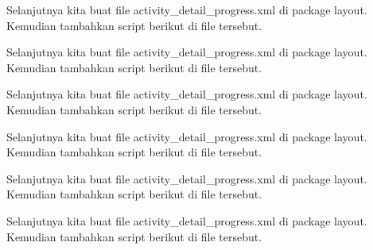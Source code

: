 

Selanjutnya kita buat file activity\_detail\_progress.xml di package layout. Kemudian tambahkan script berikut di file tersebut.





Selanjutnya kita buat file activity\_detail\_progress.xml di package layout. Kemudian tambahkan script berikut di file tersebut.





Selanjutnya kita buat file activity\_detail\_progress.xml di package layout. Kemudian tambahkan script berikut di file tersebut.





Selanjutnya kita buat file activity\_detail\_progress.xml di package layout. Kemudian tambahkan script berikut di file tersebut.








Selanjutnya kita buat file activity\_detail\_progress.xml di package layout. Kemudian tambahkan script berikut di file tersebut.





Selanjutnya kita buat file activity\_detail\_progress.xml di package layout. Kemudian tambahkan script berikut di file tersebut.





